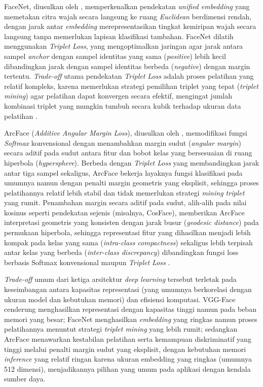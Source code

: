 FaceNet, diusulkan oleh \textcite{schroff2015facenet}, memperkenalkan pendekatan \textit{unified embedding} yang memetakan citra wajah secara langsung ke ruang \textit{Euclidean} berdimensi rendah, dengan jarak antar \textit{embedding} merepresentasikan tingkat kemiripan wajah secara langsung tanpa memerlukan lapisan klasifikasi tambahan. FaceNet dilatih menggunakan \textit{Triplet Loss}, yang mengoptimalkan jaringan agar jarak antara sampel \textit{anchor} dengan sampel identitas yang sama (\textit{positive}) lebih kecil dibandingkan jarak dengan sampel identitas berbeda (\textit{negative}) dengan margin tertentu. \textit{Trade-off} utama pendekatan \textit{Triplet Loss} adalah proses pelatihan yang relatif kompleks, karena memerlukan strategi pemilihan triplet yang tepat (\textit{triplet mining}) agar pelatihan dapat konvergen secara efektif, mengingat jumlah kombinasi triplet yang mungkin tumbuh secara kubik terhadap ukuran data pelatihan \autocite{schroff2015facenet}.

ArcFace (\textit{Additive Angular Margin Loss}), diusulkan oleh \textcite{deng2019arcface}, memodifikasi fungsi \textit{Softmax} konvensional dengan menambahkan margin sudut (\textit{angular margin}) secara aditif pada sudut antara fitur dan bobot kelas yang bersesuaian di ruang hiperbola (\textit{hypersphere}). Berbeda dengan \textit{Triplet Loss} yang membandingkan jarak antar tiga sampel sekaligus, ArcFace bekerja layaknya fungsi klasifikasi pada umumnya namun dengan penalti margin geometris yang eksplisit, sehingga proses pelatihannya relatif lebih stabil dan tidak memerlukan strategi \textit{mining triplet} yang rumit. Penambahan margin secara aditif pada sudut, alih-alih pada nilai kosinus seperti pendekatan sejenis (misalnya, CosFace), memberikan ArcFace interpretasi geometris yang konsisten dengan jarak busur (\textit{geodesic distance}) pada permukaan hiperbola, sehingga representasi fitur yang dihasilkan menjadi lebih kompak pada kelas yang sama (\textit{intra-class compactness}) sekaligus lebih terpisah antar kelas yang berbeda (\textit{inter-class discrepancy}) dibandingkan fungsi loss berbasis Softmax konvensional maupun \textit{Triplet Loss} \autocite{deng2019arcface}.

\textit{Trade-off} umum dari ketiga arsitektur \textit{deep learning} tersebut terletak pada keseimbangan antara kapasitas representasi (yang umumnya berkorelasi dengan ukuran model dan kebutuhan memori) dan efisiensi komputasi. VGG-Face cenderung menghasilkan representasi dengan kapasitas tinggi namun pada beban memori yang besar; FaceNet menghasilkan \textit{embedding} yang ringkas namun proses pelatihannya menuntut strategi \textit{triplet mining} yang lebih rumit; sedangkan ArcFace menawarkan kestabilan pelatihan serta kemampuan diskriminatif yang tinggi melalui penalti margin sudut yang eksplisit, dengan kebutuhan memori \textit{inference} yang relatif ringan karena ukuran embedding yang ringkas (umumnya 512 dimensi), menjadikannya pilihan yang umum pada aplikasi dengan kendala sumber daya.

